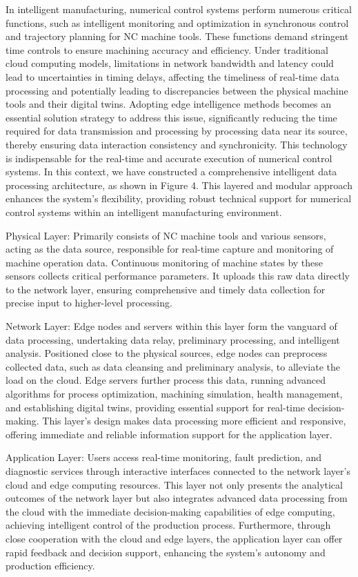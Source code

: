 \documentclass[preprint,12pt]{elsarticle}
\begin{document}
In intelligent manufacturing, numerical control systems perform numerous critical functions, such as intelligent monitoring and optimization in synchronous control and trajectory planning for NC machine tools. These functions demand stringent time controls to ensure machining accuracy and efficiency. Under traditional cloud computing models, limitations in network bandwidth and latency could lead to uncertainties in timing delays, affecting the timeliness of real-time data processing and potentially leading to discrepancies between the physical machine tools and their digital twins\cite{liu2023intelligent,xiao2024step}. Adopting edge intelligence methods becomes an essential solution strategy to address this issue, significantly reducing the time required for data transmission and processing by processing data near its source, thereby ensuring data interaction consistency and synchronicity\cite{nain2022towards}. This technology is indispensable for the real-time and accurate execution of numerical control systems. In this context, we have constructed a comprehensive intelligent data processing architecture, as shown in Figure 4. This layered and modular approach enhances the system's flexibility, providing robust technical support for numerical control systems within an intelligent manufacturing environment.

Physical Layer: Primarily consists of NC machine tools and various sensors, acting as the data source, responsible for real-time capture and monitoring of machine operation data. Continuous monitoring of machine states by these sensors collects critical performance parameters. It uploads this raw data directly to the network layer, ensuring comprehensive and timely data collection for precise input to higher-level processing.

Network Layer: Edge nodes and servers within this layer form the vanguard of data processing, undertaking data relay, preliminary processing, and intelligent analysis. Positioned close to the physical sources, edge nodes can preprocess collected data, such as data cleansing and preliminary analysis, to alleviate the load on the cloud. Edge servers further process this data, running advanced algorithms for process optimization, machining simulation, health management, and establishing digital twins, providing essential support for real-time decision-making. This layer's design makes data processing more efficient and responsive, offering immediate and reliable information support for the application layer.

Application Layer: Users access real-time monitoring, fault prediction, and diagnostic services through interactive interfaces connected to the network layer's cloud and edge computing resources. This layer not only presents the analytical outcomes of the network layer but also integrates advanced data processing from the cloud with the immediate decision-making capabilities of edge computing, achieving intelligent control of the production process. Furthermore, through close cooperation with the cloud and edge layers, the application layer can offer rapid feedback and decision support, enhancing the system's autonomy and production efficiency.
\end{document}
